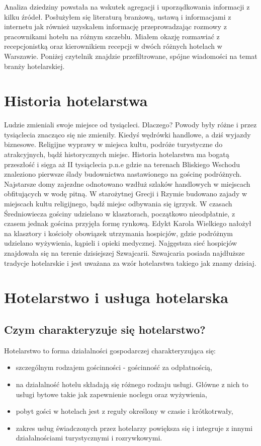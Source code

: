 \documentclass[a4paper,onecolumn,oneside,11pt,wide,floatssmall]{mwrep}
\theoremstyle{definition}
\theoremstyle{plain}%
\theoremstyle{remark}
\begin{document}
Analiza dziedziny powstała na wskutek agregacji i uporządkowania informacji 
z kilku źródeł. Posłużyłem się literaturą branżową, ustawą i informacjami z 
internetu jak również uzyskałem informację przeprowadzając rozmowy z 
pracownikami hotelu na różnym szczeblu. Miałem okazję rozmawiać z 
recepcjonistką oraz kierownikiem recepcji w dwóch różnych hotelach w 
Warszawie. Poniżej czytelnik znajdzie przefiltrowane, spójne wiadomości na
 temat branży hotelarskiej.


\section{Historia hotelarstwa} 

Ludzie zmieniali swoje miejsce od tysiącleci. Dlaczego? Powody były różne i 
przez tysiąclecia znacząco się nie zmieniły. Kiedyś wędrówki handlowe, a 
dziś wyjazdy biznesowe. Religijne wyprawy w miejsca kultu, podróże 
turystyczne do atrakcyjnych, bądź historycznych miejsc.     Historia 
hotelarstwa ma bogatą przeszłość i sięga aż II tysiąclecia p.n.e gdzie na 
terenach Bliskiego Wschodu znaleziono pierwsze ślady budownictwa 
nastawionego na gościnę podróżnych. Najstarsze domy zajezdne odnotowano 
wzdłuż szlaków handlowych w miejscach obfitujących w wodę pitną. W 
starożytnej Grecji i Rzymie budowano zajady w miejscach kultu religijnego, 
bądź miejsc odbywania się igrzysk. W czasach Średniowiecza gościny udzielano 
w klasztorach, początkowo nieodpłatnie, z czasem jednak gościna przyjęła 
formę rynkową. Edykt Karola Wielkiego nałożył na klasztory i kościoły 
obowiązek utrzymania hospicjów, gdzie podróżnym udzielano wyżywienia, 
kąpieli i opieki medycznej. Najgęstsza sieć hospicjów znajdowała się na 
terenie dzisiejszej Szwajcarii. Szwajcaria posiada najdłuższe tradycje 
hotelarskie i jest uważana za wzór hotelarstwa takiego jak znamy dzisiaj.


\section{Hotelarstwo i usługa hotelarska}

\subsection{Czym charakteryzuje się hotelarstwo?}

Hotelarstwo to forma działalności gospodarczej charakteryzująca się:
\begin{itemize} 
  \item szczególnym rodzajem gościnności - gościnność za odpłatnością,
  \item na działalność hotelu składają się różnego rodzaju usługi. Główne z 
  nich to usługi bytowe takie jak zapewnienie noclegu oraz wyżywienia,
  \item pobyt gości w hotelach jest z reguły określony w czasie i 
  krótkotrwały,
  \item zakres usług świadczonych przez hotelarzy powiększa się i integruje 
  z innymi działalnościami turystycznymi i rozrywkowymi.
\end{itemize}
\end{document}
